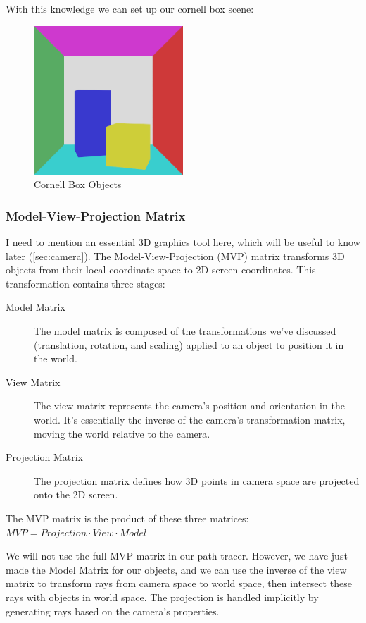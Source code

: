 \documentclass[12pt]{article}
\begin{document}
With this knowledge we can set up our cornell box scene:
\begin{figure}[H]
    \centering
    \includegraphics[width=0.5\textwidth]{images/artsy_rep/no_lighting_cornell.png}
    \caption{Cornell Box Objects}
    \label{fig:unlitcornell}
\end{figure}

\subsubsection{Model-View-Projection Matrix}
I need to mention an essential 3D graphics tool here, which will be useful to know later (\ref{sec:camera}). The Model-View-Projection (MVP) matrix transforms 3D objects from their local coordinate space to 2D screen coordinates. This transformation contains three stages:

\begin{description}
    \item[Model Matrix] The model matrix is composed of the transformations we've discussed (translation, rotation, and scaling) applied to an object to position it in the world.

    \item[View Matrix] The view matrix represents the camera's position and orientation in the world. It's essentially the inverse of the camera's transformation matrix, moving the world relative to the camera.

    \item[Projection Matrix] The projection matrix defines how 3D points in camera space are projected onto the 2D screen.

\end{description}

The MVP matrix is the product of these three matrices:
$MVP = Projection \cdot View \cdot Model $

We will not use the full MVP matrix in our path tracer. However, we have just made the Model Matrix for our objects, and we can use the inverse of the view matrix to transform rays from camera space to world space, then intersect these rays with objects in world space. The projection is handled implicitly by generating rays based on the camera's properties.
\end{document}
